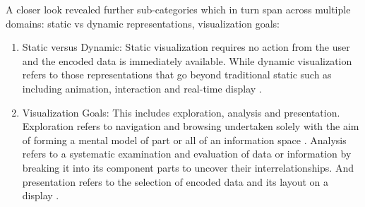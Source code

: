 \documentclass{egpubl}
\begin{document}
A closer look revealed further sub-categories which in turn span across multiple domains: static vs dynamic representations, visualization goals:
\begin{enumerate}
	\item Static versus Dynamic: Static visualization requires no action from the user and the encoded data is immediately available. While dynamic visualization refers to those representations that go beyond traditional static such as including animation, interaction and real-time display \cite{spence2007}.
	\item Visualization Goals: This includes exploration, analysis and presentation. Exploration refers to navigation and browsing undertaken solely with the aim of forming a mental model of part or all of an information space \cite{spence2007}. Analysis refers to a systematic examination and evaluation of data or information by breaking it into its component parts to uncover their interrelationships. And presentation refers to the selection of encoded data and its layout on a display \cite{spence2007}.
\end{enumerate}
\end{document}
